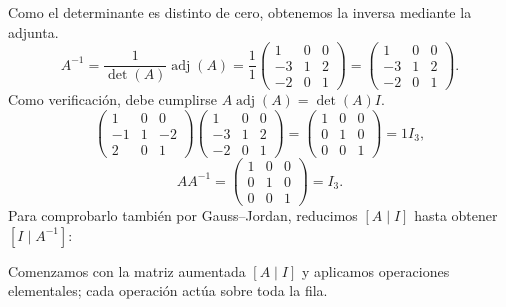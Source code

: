 \documentclass[12pt]{article}
\theoremstyle{remark}
\newcommand{\adj}{\operatorname{adj}}
\begin{document}
Como el determinante es distinto de cero, obtenemos la inversa mediante la adjunta.
\[
A^{-1}=\frac1{\det(A)}\adj(A)=\frac1{1}\begin{pmatrix}1&0&0\\-3&1&2\\-2&0&1\end{pmatrix}=\begin{pmatrix}1&0&0\\-3&1&2\\-2&0&1\end{pmatrix}.
\]
Como verificación, debe cumplirse $A\adj(A)=\det(A)I$.
\[
\begin{pmatrix}1&0&0\\-1&1&-2\\2&0&1\end{pmatrix}\begin{pmatrix}1&0&0\\-3&1&2\\-2&0&1\end{pmatrix}=\begin{pmatrix}1&0&0\\0&1&0\\0&0&1\end{pmatrix}=1I_{3},
\]
\[
AA^{-1}=\begin{pmatrix}1&0&0\\0&1&0\\0&0&1\end{pmatrix}=I_{3}.
\]
Para comprobarlo también por Gauss--Jordan, reducimos $[A\mid I]$ hasta obtener $[I\mid A^{-1}]$:

Comenzamos con la matriz aumentada $[A\mid I]$ y aplicamos operaciones elementales; cada operación actúa sobre toda la fila.
\end{document}
